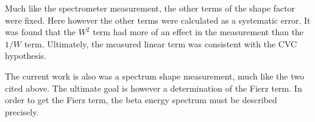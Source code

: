 \documentclass[../MaxHughesThesis.tex]{subfiles}
\begin{document}
Much like the spectrometer measurement, the other terms of the shape factor were fixed.
Here however the other terms were calculated as a systematic error.
It was found that the $W^{2}$ term had more of an effect in the measurement than the $1/W$ term.
Ultimately, the measured linear term was consistent with the CVC hypothesis. 

The current work is also was a spectrum shape measurement, much like the two cited above.
The ultimate goal is however a  determination of the Fierz term. 
In order to get the Fierz term, the beta energy spectrum must be described precisely.
\end{document}
